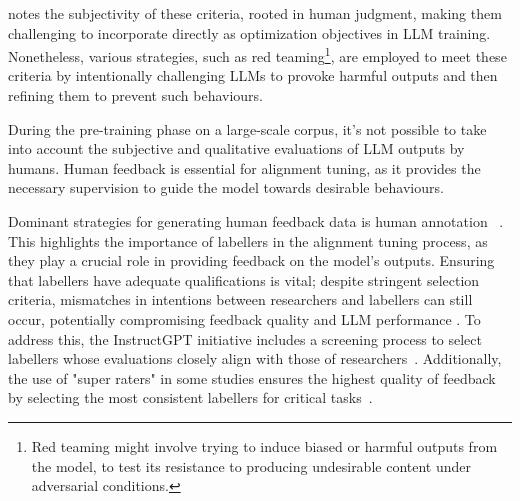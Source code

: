 \textcite{survey} notes the subjectivity of these criteria, rooted in human judgment, making them challenging to incorporate directly as optimization objectives in LLM training.
Nonetheless, various strategies, such as red teaming\footnote{Red teaming might involve trying to induce biased or harmful outputs from the model, to test its resistance to producing undesirable content under adversarial conditions.}, are employed to meet these criteria by intentionally challenging LLMs to provoke harmful outputs and then refining them to prevent such behaviours.

During the pre-training phase on a large-scale corpus, it's not possible to take into account the subjective and qualitative evaluations of LLM outputs by humans.
Human feedback is essential for alignment tuning, as it provides the necessary supervision to guide the model towards desirable behaviours.

Dominant strategies for generating human feedback data is human annotation ~\cite{ouyang2022training, glaese2022improving, ziegler2019fine}.
This highlights the importance of labellers in the alignment tuning process, as they play a crucial role in providing feedback on the model's outputs.
Ensuring that labellers have adequate qualifications is vital; despite stringent selection criteria, mismatches in intentions between researchers and labellers can still occur, potentially compromising feedback quality and LLM performance \cite{bender2021dangers}.
To address this, the InstructGPT initiative includes a screening process to select labellers whose evaluations closely align with those of researchers~\cite{ouyang2022training}.
Additionally, the use of "super raters" in some studies ensures the highest quality of feedback by selecting the most consistent labellers for critical tasks~\cite{glaese2022improving}.

